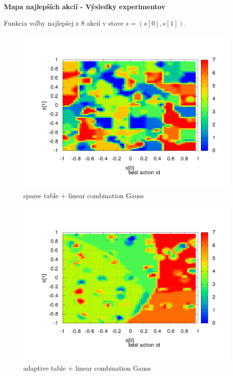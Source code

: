 \documentclass[xcolor=dvipsnames]{beamer}
\begin{document}
\begin{frame}{\bf Mapa najlepších akcií - Výsledky experimentov}

Funkcia voľby najlepšej z 8 akcií v stave  $s = (s[0], s[1])$.

\begin{minipage}{.5\textwidth}

\begin{figure}
\includegraphics[scale=.21]{../../results_q_learning/map_2/function_type_3/iterations_10/action_best_value_log_surface.png}
\caption{sparse table + linear combination Gauss}
\end{figure}


\end{minipage}%
\begin{minipage}{.5\textwidth}

\begin{figure}
\includegraphics[scale=.21]{../../results_q_learning/map_2/function_type_6/iterations_10/action_best_value_log_surface.png}
\caption{adaptive table + linear combination Gauss}
\end{figure}


\end{minipage}
\end{frame}
\end{document}
